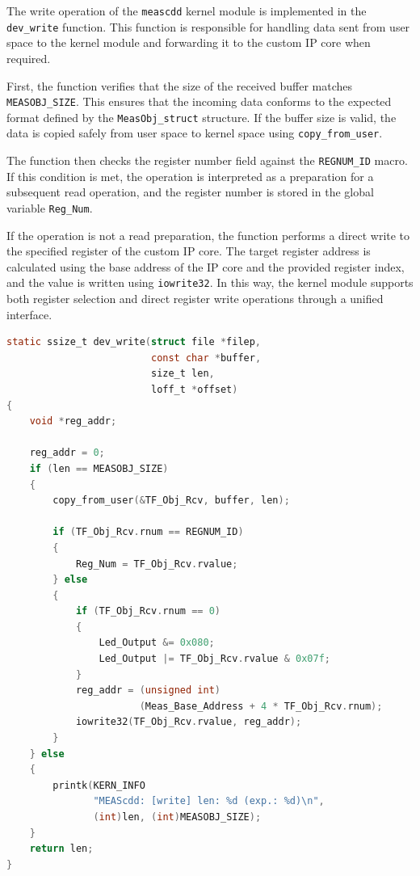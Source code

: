 \documentclass{article}
\begin{document}
The write operation of the \texttt{meascdd} kernel module is implemented in the \texttt{dev\_write} function. This function is responsible for handling data sent from user space to the kernel module and forwarding it to the custom IP core when required.

First, the function verifies that the size of the received buffer matches \texttt{MEASOBJ\_SIZE}. This ensures that the incoming data conforms to the expected format defined by the \texttt{MeasObj\_struct} structure. If the buffer size is valid, the data is copied safely from user space to kernel space using \texttt{copy\_from\_user}.

The function then checks the register number field against the \texttt{REGNUM\_ID} macro. If this condition is met, the operation is interpreted as a preparation for a subsequent read operation, and the register number is stored in the global variable \texttt{Reg\_Num}.

If the operation is not a read preparation, the function performs a direct write to the specified register of the custom IP core. The target register address is calculated using the base address of the IP core and the provided register index, and the value is written using \texttt{iowrite32}. In this way, the kernel module supports both register selection and direct register write operations through a unified interface.

\begin{lstlisting}[language=C,
caption={Write operation implementation of the meascdd kernel module},
label={lst:meascdd_write}]
static ssize_t dev_write(struct file *filep,
                         const char *buffer,
                         size_t len,
                         loff_t *offset)
{
    void *reg_addr;

    reg_addr = 0;
    if (len == MEASOBJ_SIZE) 
    {
        copy_from_user(&TF_Obj_Rcv, buffer, len);

        if (TF_Obj_Rcv.rnum == REGNUM_ID) 
        {
            Reg_Num = TF_Obj_Rcv.rvalue;
        } else 
        {
            if (TF_Obj_Rcv.rnum == 0) 
            {
                Led_Output &= 0x080;
                Led_Output |= TF_Obj_Rcv.rvalue & 0x07f;
            }
            reg_addr = (unsigned int)
                       (Meas_Base_Address + 4 * TF_Obj_Rcv.rnum);
            iowrite32(TF_Obj_Rcv.rvalue, reg_addr);
        }
    } else 
    {
        printk(KERN_INFO
               "MEAScdd: [write] len: %d (exp.: %d)\n",
               (int)len, (int)MEASOBJ_SIZE);
    }
    return len;
}
\end{lstlisting}
\end{document}
